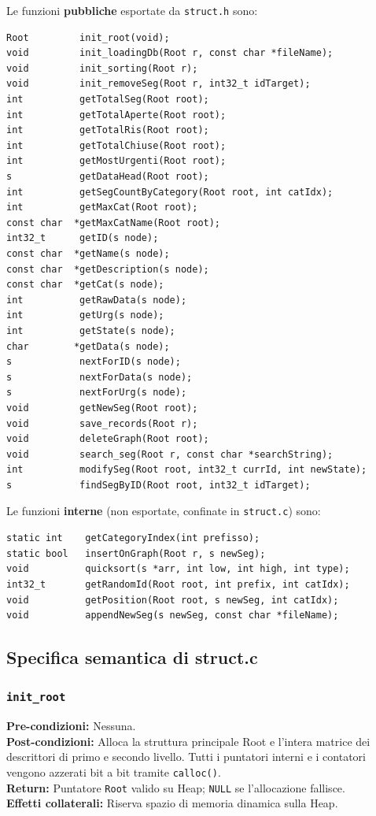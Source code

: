 \documentclass[12pt, a4paper]{article}
\begin{document}
Le funzioni \textbf{pubbliche} esportate da \texttt{struct.h} sono:
\begin{lstlisting}[style=cstyle, numbers=none]
Root         init_root(void);
void         init_loadingDb(Root r, const char *fileName);
void         init_sorting(Root r);
void         init_removeSeg(Root r, int32_t idTarget);
int          getTotalSeg(Root root);
int          getTotalAperte(Root root);
int          getTotalRis(Root root);
int          getTotalChiuse(Root root);
int          getMostUrgenti(Root root);
s            getDataHead(Root root);
int          getSegCountByCategory(Root root, int catIdx);
int          getMaxCat(Root root);
const char  *getMaxCatName(Root root);
int32_t      getID(s node);
const char  *getName(s node);
const char  *getDescription(s node);
const char  *getCat(s node);
int          getRawData(s node);
int          getUrg(s node);
int          getState(s node);
char        *getData(s node);
s            nextForID(s node);
s            nextForData(s node);
s            nextForUrg(s node);
void         getNewSeg(Root root);
void         save_records(Root r);
void         deleteGraph(Root root);
void         search_seg(Root r, const char *searchString);
int          modifySeg(Root root, int32_t currId, int newState);
s            findSegByID(Root root, int32_t idTarget);
\end{lstlisting}

\newpage

Le funzioni \textbf{interne} (non esportate, confinate in \texttt{struct.c}) sono:
\begin{lstlisting}[style=cstyle, numbers=none]
static int    getCategoryIndex(int prefisso);
static bool   insertOnGraph(Root r, s newSeg);
void          quicksort(s *arr, int low, int high, int type);
int32_t       getRandomId(Root root, int prefix, int catIdx);
void          getPosition(Root root, s newSeg, int catIdx);
void          appendNewSeg(s newSeg, const char *fileName);
\end{lstlisting}

\subsection{Specifica semantica di struct.c}

\subsubsection{\texttt{init\_root}}
\vspace{3mm}
\begin{specbox}
\textbf{Pre-condizioni:} Nessuna. \\
\textbf{Post-condizioni:} Alloca la struttura principale Root e l'intera matrice dei descrittori di primo e secondo livello. Tutti i puntatori interni e i contatori vengono azzerati bit a bit tramite \texttt{calloc()}. \\
\textbf{Return:} Puntatore \texttt{Root} valido su Heap; \texttt{NULL} se l'allocazione fallisce. \\
\textbf{Effetti collaterali:} Riserva spazio di memoria dinamica sulla Heap.
\end{specbox}
\end{document}
